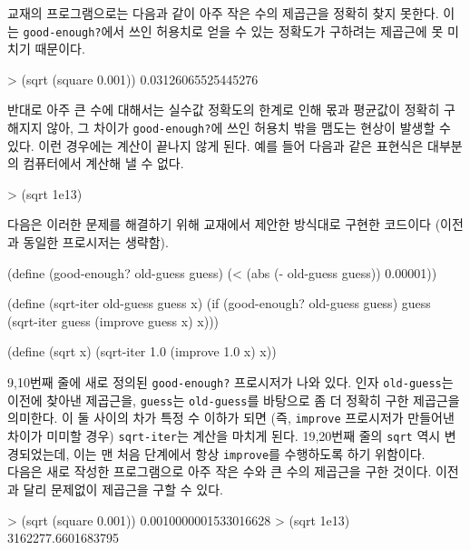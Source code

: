
교재의 프로그램으로는 다음과 같이 아주 작은 수의 제곱근을 정확히 찾지
못한다. 이는 \texttt{good-enough?}에서 쓰인 허용치로 얻을 수 있는 정확도가
구하려는 제곱근에 못 미치기 때문이다.

\begin{lisp}
> (sqrt (square 0.001))
0.03126065525445276
\end{lisp}

반대로 아주 큰 수에 대해서는 실수값 정확도의 한계로 인해 몫과 평균값이 정확히
구해지지 않아, 그 차이가 \texttt{good-enough?}에 쓰인 허용치 밖을 맴도는
현상이 발생할 수 있다. 이런 경우에는 계산이 끝나지 않게 된다. 예를 들어 다음과
같은 표현식은 대부분의 컴퓨터에서 계산해 낼 수 없다.

\begin{lisp}
> (sqrt 1e13)
\end{lisp}

다음은 이러한 문제를 해결하기 위해 교재에서 제안한 방식대로 구현한 코드이다
(이전과 동일한 프로시저는 생략함).

\begin{lisp}
(define (good-enough? old-guess guess)
  (< (abs (- old-guess guess)) 0.00001))

(define (sqrt-iter old-guess guess x)
  (if (good-enough? old-guess guess)
      guess
      (sqrt-iter guess
                 (improve guess x)
                 x)))

(define (sqrt x)
  (sqrt-iter 1.0 (improve 1.0 x) x))
\end{lisp}

9,10번째 줄에 새로 정의된 \texttt{good-enough?} 프로시저가 나와 있다. 인자
\texttt{old-guess}는 이전에 찾아낸 제곱근을, \texttt{guess}는
\texttt{old-guess}를 바탕으로 좀 더 정확히 구한 제곱근을 의미한다. 이 둘
사이의 차가 특정 수 이하가 되면 (즉, \texttt{improve} 프로시저가 만들어낸
차이가 미미할 경우) \texttt{sqrt-iter}는 계산을 마치게 된다. 19,20번째 줄의
\texttt{sqrt} 역시 변경되었는데, 이는 맨 처음 단계에서 항상 \texttt{improve}를
수행하도록 하기 위함이다.\\

다음은 새로 작성한 프로그램으로 아주 작은 수와 큰 수의 제곱근을 구한
것이다. 이전과 달리 문제없이 제곱근을 구할 수 있다.
\begin{lisp}
> (sqrt (square 0.001))
0.0010000001533016628
> (sqrt 1e13)
3162277.6601683795
\end{lisp}


